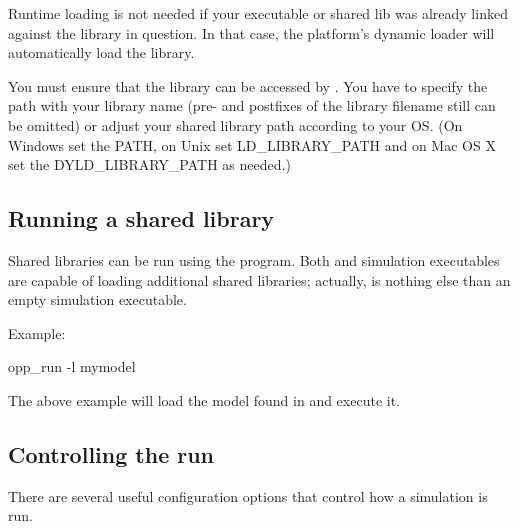 \begin{note}
  Runtime loading is not needed if your executable or shared lib was
  already linked against the library in question. In that case,
  the platform's dynamic loader will automatically load the library.
\end{note}

\begin{note}
  You must ensure that the library can be accessed by {\opp} . You have to specify
  the path with your library name (pre- and postfixes of the library filename
  still can be omitted) or adjust your shared library path according to your OS.
  (On Windows set the PATH, on Unix set LD\_LIBRARY\_PATH and on Mac OS X
  set the DYLD\_LIBRARY\_PATH as needed.)
\end{note}

\subsection{Running a shared library}

Shared libraries can be run using the  program.
Both  and simulation executables are capable of
loading additional shared libraries; actually, 
is nothing else than an empty simulation executable.

Example:
\begin{commandline}
opp_run -l mymodel
\end{commandline}

The above example will load the model found in  and execute it.

\subsection{Controlling the run}

There are several useful configuration options that control how a simulation is run.

